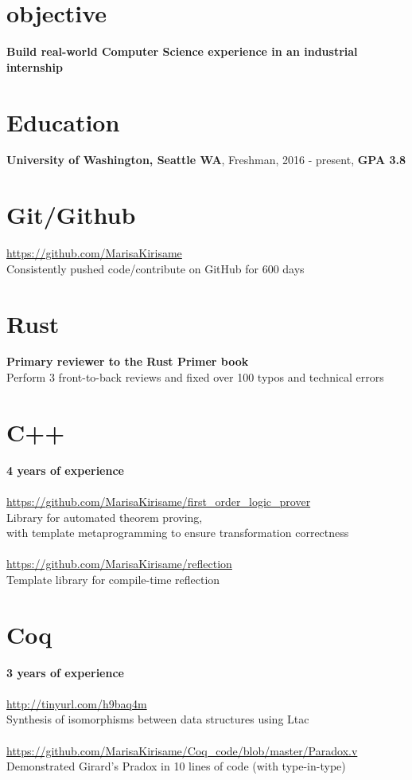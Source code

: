 \documentclass[margin,line]{res}
\begin{document}

\begin{resume}



\section{\sc objective}
\textbf{Build real-world Computer Science experience in an industrial internship}

\section{\sc Education}
\textbf{University of Washington, Seattle WA}, Freshman, 2016 - present, 
\textbf{GPA 3.8}

\section{\sc Git/Github}
\url{https://github.com/MarisaKirisame} \\
Consistently pushed code/contribute on GitHub for 600 days

\section{\sc Rust}
\textbf{Primary reviewer to the Rust Primer book} \\
Perform 3 front-to-back reviews and fixed over 100 typos and technical errors

\section{\sc C++} 
\textbf{4 years of experience} \\
\\
\url{https://github.com/MarisaKirisame/first_order_logic_prover} \\
Library for automated theorem proving, \\
with template metaprogramming to ensure transformation correctness \\
\\
\url{https://github.com/MarisaKirisame/reflection} \\
Template library for compile-time reflection

\section{\sc Coq} 
\textbf{3 years of experience} \\
\\
\url{http://tinyurl.com/h9baq4m} \\
Synthesis of isomorphisms between data structures using Ltac \\
\\
\url{https://github.com/MarisaKirisame/Coq_code/blob/master/Paradox.v} \\
Demonstrated Girard's Pradox in 10 lines of code (with type-in-type)


\end{resume}
\end{document}
